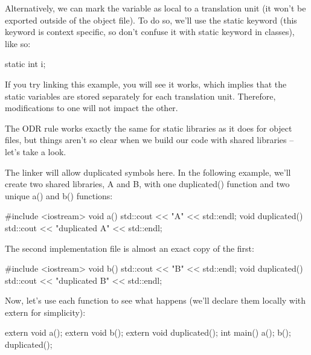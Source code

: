 Alternatively, we can mark the variable as local to a translation unit (it won’t be exported outside of the object file). To do so, we’ll use the static keyword (this keyword is context specific, so don’t confuse it with static keyword in classes), like so:


\begin{cpp}
static int i;
\end{cpp}

If you try linking this example, you will see it works, which implies that the static variables are stored separately for each translation unit. Therefore, modifications to one will not impact the other.

The ODR rule works exactly the same for static libraries as it does for object files, but things aren’t so clear when we build our code with shared libraries – let’s take a look.


The linker will allow duplicated symbols here. In the following example, we’ll create two shared libraries, A and B, with one duplicated() function and two unique a() and b() functions:


\begin{cpp}
#include <iostream>
void a() {
    std::cout << "A" << std::endl;
}
void duplicated() {
    std::cout << "duplicated A" << std::endl;
}
\end{cpp}

The second implementation file is almost an exact copy of the first:


\begin{cpp}
#include <iostream>
void b() {
    std::cout << "B" << std::endl;
}
void duplicated() {
    std::cout << "duplicated B" << std::endl;
}
\end{cpp}

Now, let’s use each function to see what happens (we’ll declare them locally with extern for simplicity):


\begin{cpp}
extern void a();
extern void b();
extern void duplicated();
int main() {
    a();
    b();
    duplicated();
}
\end{cpp}

